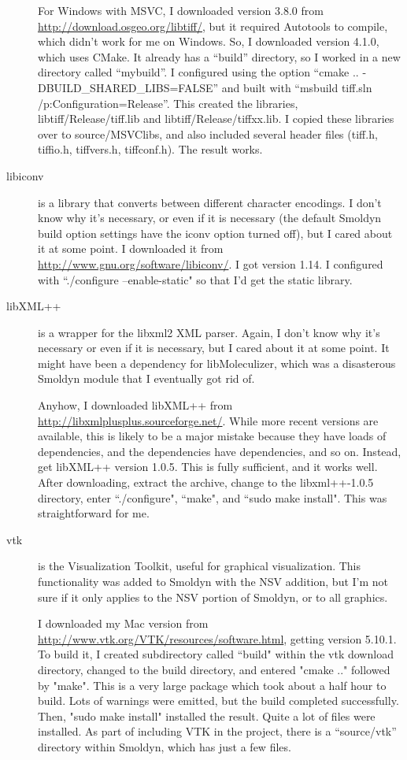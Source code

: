 \documentclass {scrbook}
\begin{document}
\begin{description}
For Windows with MSVC, I downloaded version 3.8.0 from \url{http://download.osgeo.org/libtiff/}, but it required Autotools to compile, which didn't work for me on Windows. So, I downloaded version 4.1.0, which uses CMake. It already has a ``build'' directory, so I worked in a new directory called ``mybuild''. I configured using the option ``cmake .. -DBUILD\_SHARED\_LIBS=FALSE'' and built with ``msbuild tiff.sln /p:Configuration=Release''. This created the libraries, libtiff/Release/tiff.lib and libtiff/Release/tiffxx.lib. I copied these libraries over to source/MSVClibs, and also included several header files (tiff.h, tiffio.h, tiffvers.h, tiffconf.h). The result works.

\item[libiconv] is a library that converts between different character encodings. I don't know why it's necessary, or even if it is necessary (the default Smoldyn build option settings have the iconv option turned off), but I cared about it at some point. I downloaded it from \url{http://www.gnu.org/software/libiconv/}. I got version 1.14. I configured with ``./configure --enable-static" so that I'd get the static library.

\item[libXML++] is a wrapper for the libxml2 XML parser. Again, I don't know why it's necessary or even if it is necessary, but I cared about it at some point. It might have been a dependency for libMoleculizer, which was a disasterous Smoldyn module that I eventually got rid of.

Anyhow, I downloaded libXML++ from \url{http://libxmlplusplus.sourceforge.net/}. While more recent versions are available, this is likely to be a major mistake because they have loads of dependencies, and the dependencies have dependencies, and so on. Instead, get libXML++ version 1.0.5. This is fully sufficient, and it works well. After downloading, extract the archive, change to the libxml++-1.0.5 directory, enter ``./configure", ``make", and ``sudo make install". This was straightforward for me.

\item[vtk] is the Visualization Toolkit, useful for graphical visualization. This functionality was added to Smoldyn with the NSV addition, but I'm not sure if it only applies to the NSV portion of Smoldyn, or to all graphics.

I downloaded my Mac version from \url{http://www.vtk.org/VTK/resources/software.html}, getting version 5.10.1. To build it, I created subdirectory called ``build" within the vtk download directory, changed to the build directory, and entered "cmake .." followed by "make". This is a very large package which took about a half hour to build. Lots of warnings were emitted, but the build completed successfully. Then, "sudo make install" installed the result. Quite a lot of files were installed. As part of including VTK in the project, there is a ``source/vtk'' directory within Smoldyn, which has just a few files.


\end{description}
\end{document}
